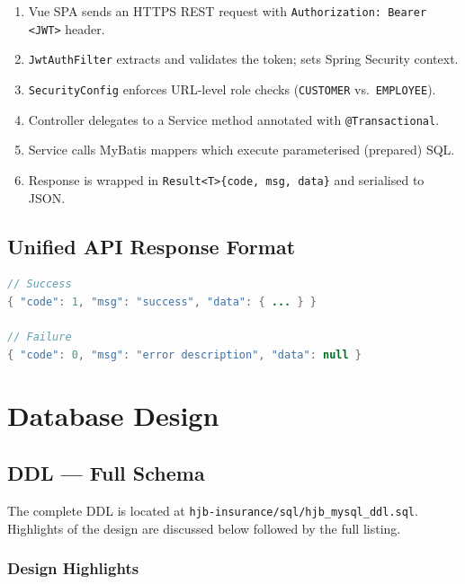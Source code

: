 \documentclass[12pt,letterpaper]{article}
\begin{document}
\begin{enumerate}
  \item Vue SPA sends an HTTPS REST request with \texttt{Authorization: Bearer <JWT>} header.
  \item \texttt{JwtAuthFilter} extracts and validates the token; sets Spring Security context.
  \item \texttt{SecurityConfig} enforces URL-level role checks (\texttt{CUSTOMER} vs.\ \texttt{EMPLOYEE}).
  \item Controller delegates to a Service method annotated with \texttt{@Transactional}.
  \item Service calls MyBatis mappers which execute parameterised (prepared) SQL.
  \item Response is wrapped in \texttt{Result<T>\{code, msg, data\}} and serialised to JSON.
\end{enumerate}

\subsection{Unified API Response Format}

\begin{lstlisting}[language=Java,caption={Result wrapper used by all endpoints}]
// Success
{ "code": 1, "msg": "success", "data": { ... } }

// Failure
{ "code": 0, "msg": "error description", "data": null }
\end{lstlisting}

\section{Database Design}

\subsection{DDL --- Full Schema}

The complete DDL is located at \texttt{hjb-insurance/sql/hjb\_mysql\_ddl.sql}. Highlights of the design are discussed below followed by the full listing.

\subsubsection*{Design Highlights}
\end{document}
